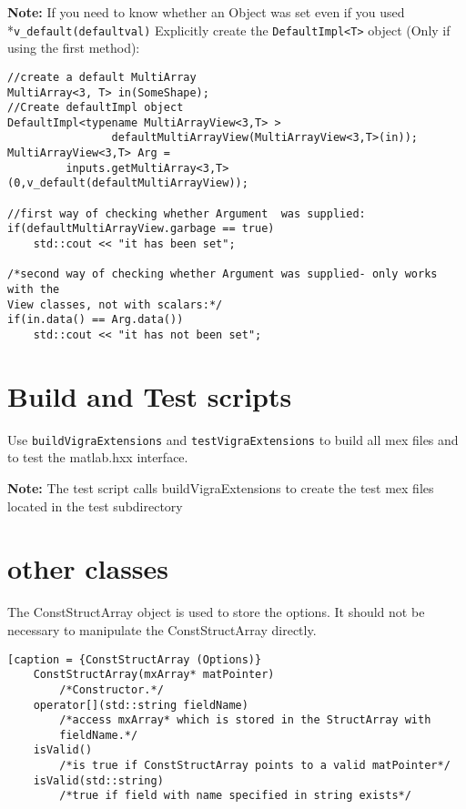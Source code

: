 \documentclass[a4paper,10pt]{article}
\begin{document}
\textbf{Note:} 	If you need to know whether an Object was set even if you used \\*\verb+v_default(defaultval)+
	Explicitly create the \verb+DefaultImpl<T>+ object (Only if using the first method):

\begin{lstlisting}[caption={Finding out whether a default object was set}]	
//create a default MultiArray
MultiArray<3, T> in(SomeShape);
//Create defaultImpl object
DefaultImpl<typename MultiArrayView<3,T> > 
				defaultMultiArrayView(MultiArrayView<3,T>(in));
MultiArrayView<3,T> Arg = 
		 inputs.getMultiArray<3,T>(0,v_default(defaultMultiArrayView));

//first way of checking whether Argument  was supplied:
if(defaultMultiArrayView.garbage == true) 
	std::cout << "it has been set";

/*second way of checking whether Argument was supplied- only works with the 
View classes, not with scalars:*/
if(in.data() == Arg.data()) 
	std::cout << "it has not been set";
\end{lstlisting}
\section{Build and Test scripts}
Use \verb+buildVigraExtensions+ and \verb+testVigraExtensions+ to build all mex files and to test the 
matlab.hxx interface.

\textbf{Note:} The test script calls buildVigraExtensions to create the test mex files located
in the test subdirectory

\section{other classes}
The ConstStructArray object is used to store the options.
It should not be necessary to manipulate the ConstStructArray directly.
\begin{lstlisting}[caption = {ConstStructArray (Options)}
	ConstStructArray(mxArray* matPointer)
		/*Constructor.*/
	operator[](std::string fieldName)
		/*access mxArray* which is stored in the StructArray with 
		fieldName.*/
	isValid()
		/*is true if ConstStructArray points to a valid matPointer*/
	isValid(std::string)
		/*true if field with name specified in string exists*/
\end{lstlisting}
\end{document}

